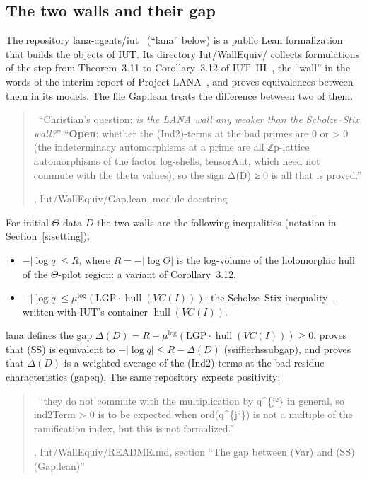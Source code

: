 \documentclass[11pt,a4paper]{article}
\newcommand{\hull}{\operatorname{hull}}
\newcommand{\mulog}{\mu^{\log}}
\newcommand{\leanus}{\textunderscore\allowbreak}
\newcommand{\lean}[1]{{\ttfamily\let\_\leanus #1}}
\newcommand{\lab}[2]{{\upshape\fcolorbox{#1}{#1!8}{\scriptsize\sffamily\bfseries\textcolor{#1}{#2}}}}
\newcommand{\tagX}{\lab{Purple}{X}}
\newcommand{\q}[1]{``#1''}
\newcommand{\xquote}[2]{\begin{quote}\small\tagX\ #1\par\nopagebreak\hfill{\footnotesize #2}\end{quote}}
\theoremstyle{plain}
\theoremstyle{definition}
\theoremstyle{remark}
\begin{document}
\subsection{The two walls and their gap}
The repository lana-agents/iut~\cite{lana} (``lana'' below) is a public Lean formalization that builds the objects of
IUT. Its directory \lean{Iut/WallEquiv/} collects formulations of the step from Theorem~3.11 to Corollary~3.12 of
IUT~III~\cite{IUT3}, the \q{wall} in the words of the interim report of Project LANA~\cite[\S0.2]{LANA}, and proves
equivalences between them in its models. The file \lean{Gap.lean} treats the difference between two of them.

\xquote{``Christian's question: \emph{is the LANA wall any weaker than the Scholze--Stix wall?}''\quad
``\textbf{Open}: whether the (Ind2)-terms at the bad primes are \lean{0} or \lean{> 0} (the indeterminacy
automorphisms at a prime are all \lean{ℤ\_p}-lattice automorphisms of the factor log-shells, \lean{tensorAut}, which
need not commute with the theta values); so the sign \lean{Δ(D) ≥ 0} is all that is proved.''}{\cite{lana},
\lean{Iut/WallEquiv/Gap.lean}, module docstring}

For initial $\Theta$-data $D$ the two walls are the following inequalities (notation in Section~\ref{s:setting}).
\begin{itemize}
\item[(Var)] $-|\log q|\le R$, where $R=-|\log\Theta|$ is the log-volume of the holomorphic hull of the
$\Theta$-pilot region: a variant of Corollary~3.12.
\item[(SS)] $-|\log q|\le\mulog(\mathrm{LGP}\cdot\hull(VC(I)))$: the Scholze--Stix inequality~\cite{SS}, written with
IUT's container $\hull(VC(I))$.
\end{itemize}
lana defines the gap $\Delta(D)=R-\mulog(\mathrm{LGP}\cdot\hull(VC(I)))\ge0$, proves that (SS) is equivalent to
$-|\log q|\le R-\Delta(D)$ (\lean{ss\_iff\_le\_rhs\_sub\_gap}), and proves that $\Delta(D)$ is a weighted average of
the (Ind2)-terms at the bad residue characteristics (\lean{gap\_eq}). The same repository expects positivity:

\xquote{``they do not commute with the multiplication by \lean{q\^{}\{j²\}} in general, so \lean{ind2Term > 0} is to be
expected when \lean{ord(q\^{}\{j²\})} is not a multiple of the ramification index, but this is not
formalized.''}{\cite{lana}, \lean{Iut/WallEquiv/README.md}, section ``The gap between (Var) and (SS) (\lean{Gap.lean})''}
\end{document}
